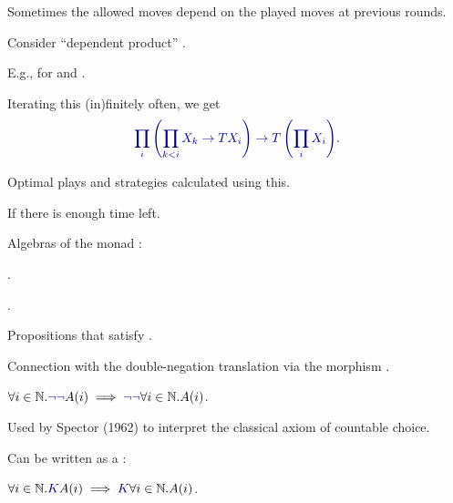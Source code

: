 \documentclass%
[%
Screen4to3,
]{foils}
\begin{document}

  Sometimes  the allowed moves depend on the played moves at previous rounds.

\vfill

  Consider ``dependent product''
. 


\vfill

E.g.,  for  and
  .

\vfill

Iterating this (in)finitely often, we get
\[
\darkblue{\prod_i \left(\prod_{k < i} X_k \to T X_i \right) \to T\left(\prod_i X_i\right)}.
\]

Optimal plays and strategies calculated using this.


If there is enough time left.



Algebras of the monad :

\qquad {}.

\qquad {}.

\qquad Propositions that satisfy .

\vfill


Connection with the double-negation translation via the morphism .


$\forall i \in \N.\darkblue{\neg \neg} A(i) \implies \darkblue{\neg \neg} \forall i \in \N.A(i)$.

\vfill

Used by Spector (1962) to interpret the classical axiom of countable choice.

\vfill

Can be written as a :

\qquad 
$\forall i \in \N. \darkblue{K} A(i) \implies \darkblue{K} \forall i \in \N.A(i)$.

\qquad
\end{document}
